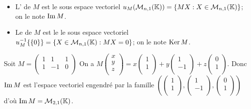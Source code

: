 \documentclass{book}
\begin{document}
\begin{Definition}
\begin{itemize}
\item
  L' de $M$ est le sous espace vectoriel $u_M(\mathcal{M}_{n,1}(\mathbb{K})) = \{MX:X\in \mathcal{M}_{n,1}(\mathbb{K})\}$;
  on le note $\operatorname{Im} M$.
\item
  Le  de $M$ est le le sous espace vectoriel $u_M^{-1}\{ \{0 \}\} = \{X\in  \mathcal{M}_{n,1}(\mathbb{K}):MX=0\}$;
  on le note $\operatorname{Ker} M$.
\end{itemize}
\end{Definition}

\begin{Exemple}
Soit $M=\begin{pmatrix}
1&1&1\\
1&-1&0\\
\end{pmatrix}$
On a $M\begin{pmatrix}x \\y \\z\\\end{pmatrix}=x\begin{pmatrix}1\\1\\ \end{pmatrix}+y\begin{pmatrix}1\\-1\\ \end{pmatrix}+z\begin{pmatrix}0\\1\\ \end{pmatrix}$.
Donc $\operatorname{Im} M$ est l'espace vectoriel engendré par la famille $(\begin{pmatrix}1\\1\\ \end{pmatrix},\begin{pmatrix}1\\-1\\ \end{pmatrix},\begin{pmatrix}0\\1\\ \end{pmatrix})$ d'où $\operatorname{Im} M=\mathcal{M}_{2,1}(\mathbb{K})$.

\end{Exemple}
\end{document}
